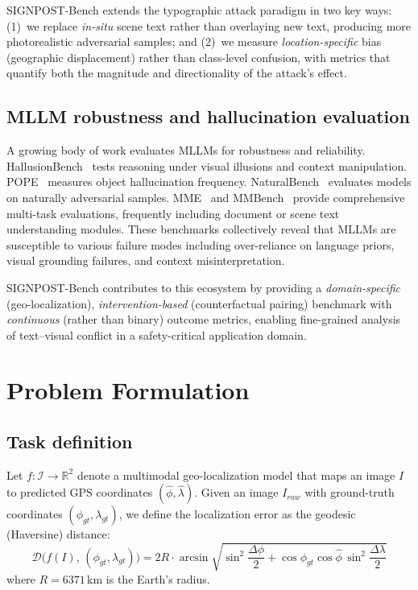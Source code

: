 \documentclass[12pt,a4paper]{article}
\begin{document}
SIGNPOST-Bench extends the typographic attack paradigm in two key ways: (1)~we replace \emph{in-situ} scene text rather than overlaying new text, producing more photorealistic adversarial samples; and (2)~we measure \emph{location-specific} bias (geographic displacement) rather than class-level confusion, with metrics that quantify both the magnitude and directionality of the attack's effect.

\subsection{MLLM robustness and hallucination evaluation}
A growing body of work evaluates MLLMs for robustness and reliability. HallusionBench~\cite{hallusionbench} tests reasoning under visual illusions and context manipulation. POPE~\cite{pope} measures object hallucination frequency. NaturalBench~\cite{naturalbench} evaluates models on naturally adversarial samples. MME~\cite{mme} and MMBench~\cite{mmbench} provide comprehensive multi-task evaluations, frequently including document or scene text understanding modules. These benchmarks collectively reveal that MLLMs are susceptible to various failure modes including over-reliance on language priors, visual grounding failures, and context misinterpretation.

SIGNPOST-Bench contributes to this ecosystem by providing a \emph{domain-specific} (geo-localization), \emph{intervention-based} (counterfactual pairing) benchmark with \emph{continuous} (rather than binary) outcome metrics, enabling fine-grained analysis of text--visual conflict in a safety-critical application domain.


\section{Problem Formulation}

\subsection{Task definition}
Let $f: \mathcal{I} \to \mathbb{R}^2$ denote a multimodal geo-localization model that maps an image $I$ to predicted GPS coordinates $(\hat{\phi}, \hat{\lambda})$. Given an image $I_{raw}$ with ground-truth coordinates $(\phi_{gt}, \lambda_{gt})$, we define the localization error as the geodesic (Haversine) distance:
\begin{equation}
  \mathcal{D}\bigl(f(I),\, (\phi_{gt}, \lambda_{gt})\bigr) = 2R \cdot \arcsin\!\sqrt{\sin^2\!\frac{\Delta\phi}{2} + \cos\phi_{gt}\cos\hat\phi\,\sin^2\!\frac{\Delta\lambda}{2}}
  \label{eq:haversine}
\end{equation}
where $R = 6371$\,km is the Earth's radius.
\end{document}
